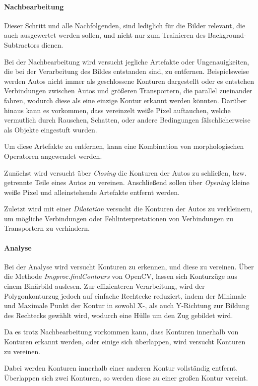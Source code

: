 \paragraph*{Nachbearbeitung}
Dieser Schritt und alle Nachfolgenden, sind lediglich für die Bilder relevant, die auch ausgewertet werden sollen, und nicht nur zum Trainieren des Background-Subtractors dienen.

Bei der Nachbearbeitung wird versucht jegliche Artefakte oder Ungenauigkeiten, die bei der Verarbeitung des Bildes entstanden sind, zu entfernen.
Beispielsweise werden Autos nicht immer als geschlossene Konturen dargestellt oder es entstehen Verbindungen zwischen Autos und größeren Transportern, die parallel zueinander fahren, wodurch diese als eine einzige Kontur erkannt werden könnten. Darüber hinaus kann es vorkommen, dass vereinzelt weiße Pixel auftauchen, welche vermutlich durch Rauschen, Schatten, oder andere Bedingungen fälschlicherweise als Objekte eingestuft wurden.

Um diese Artefakte zu entfernen, kann eine Kombination von morphologischen Operatoren angewendet werden.

Zunächst wird versucht über {\em Closing} die Konturen der Autos zu schließen, bzw. getrennte Teile eines Autos zu vereinen.
Anschließend sollen über {\em Opening} kleine weiße Pixel und alleinstehende Artefakte entfernt werden.

Zuletzt wird mit einer {\em Dilatation} versucht die Konturen der Autos zu verkleinern, um mögliche Verbindungen oder Fehlinterpretationen von Verbindungen zu Transportern zu verhindern.

\paragraph*{Analyse}
Bei der Analyse wird versucht Konturen zu erkennen, und diese zu vereinen.
Über die Methode {\em Imgproc.findContours} von OpenCV, lassen sich Konturzüge aus einem Binärbild auslesen.
Zur effizienteren Verarbeitung, wird der Polygonkonturzug jedoch auf einfache Rechtecke reduziert, indem der Minimale und Maximale Punkt der Kontur in sowohl X-, als auch Y-Richtung zur Bildung des Rechtecks gewählt wird, wodurch eine Hülle um den Zug gebildet wird.

Da es trotz Nachbearbeitung vorkommen kann, dass Konturen innerhalb von Konturen erkannt werden, oder einige sich überlappen, wird versucht Konturen zu vereinen.

Dabei werden Konturen innerhalb einer anderen Kontur vollständig entfernt. Überlappen sich zwei Konturen, so werden diese zu einer großen Kontur vereint.

